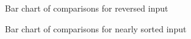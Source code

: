 \documentclass[12pt,a4paper]{article}
\begin{document}
\begin{center}
\begin{figure}[H]
\caption{Bar chart of comparisons for reversed input}
\end{figure}
\end{center}

\begin{center}
\begin{figure}[H]
\caption{Bar chart of comparisons for nearly sorted input}
\end{figure}
\end{center}
\end{document}
